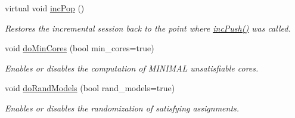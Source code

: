 \begin{DoxyCompactItemize}
virtual void \hyperlink{classMiniSatApi_af388f97db15f77baeb420a8fef74ca6a}{inc\-Pop} ()
\begin{DoxyCompactList}\small\item\em Restores the incremental session back to the point where \hyperlink{classMiniSatApi_a27013ace25320f68252bef5ba9f2e9ad}{inc\-Push()} was called. \end{DoxyCompactList}\item 
void \hyperlink{classSatSolver_a159fc9658709e5aeba2844a09454b2cb}{do\-Min\-Cores} (bool min\-\_\-cores=true)
\begin{DoxyCompactList}\small\item\em Enables or disables the computation of M\-I\-N\-I\-M\-A\-L unsatisfiable cores. \end{DoxyCompactList}\item 
void \hyperlink{classSatSolver_ae229c5e277350710412fce0e867dc566}{do\-Rand\-Models} (bool rand\-\_\-models=true)
\begin{DoxyCompactList}\small\item\em Enables or disables the randomization of satisfying assignments. \end{DoxyCompactList}\end{DoxyCompactItemize}
